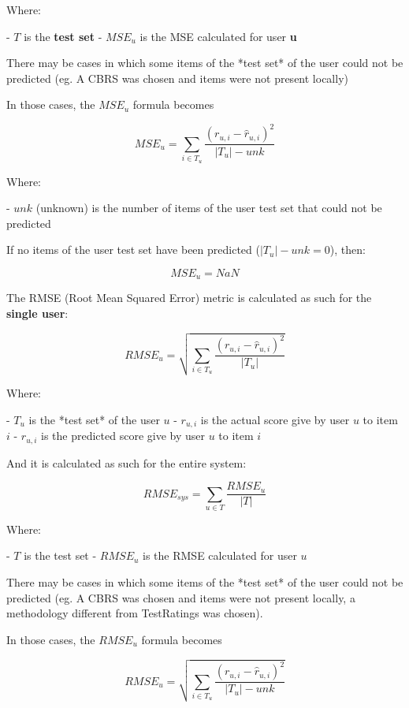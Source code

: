     Where:

    - $T$ is the \textbf{test set}
    - $MSE_u$ is the MSE calculated for user \textbf{u}

\hfill\break

There may be cases in which some items of the *test set* of the user could not be predicted (eg. A CBRS was chosen
and items were not present locally)

    In those cases, the $MSE_u$ formula becomes

    \[
    MSE_u = \sum_{i \in T_u} \frac{(r_{u,i} - \hat{r}_{u,i})^2}{|T_u| - unk}
    \]

    Where:

    - $unk$ (unknown) is the number of items of the user test set that could not be predicted

\hfill\break

If no items of the user test set have been predicted ($|T_u| - unk = 0$), then:

    \[
    MSE_u = NaN
    \]

\hfill\break


The RMSE (Root Mean Squared Error) metric is calculated as such for the \textbf{single user}:

    \[
    RMSE_u = \sqrt{\sum_{i \in T_u} \frac{(r_{u,i} - \hat{r}_{u,i})^2}{|T_u|}}
    \]

    Where:

    - $T_u$ is the *test set* of the user $u$
    - $r_{u, i}$ is the actual score give by user $u$ to item $i$
    - $\hat{r}_{u, i}$ is the predicted score give by user $u$ to item $i$

\hfill\break

And it is calculated as such for the entire system:

    \[
    RMSE_{sys} = \sum_{u \in T} \frac{RMSE_u}{|T|}
    \]

    Where:

    - $T$ is the test set
    - $RMSE_u$ is the RMSE calculated for user $u$

\hfill\break

There may be cases in which some items of the *test set* of the user could not be predicted (eg. A CBRS was chosen
and items were not present locally, a methodology different from TestRatings was chosen).

In those cases, the $RMSE_u$ formula becomes

    \[
    RMSE_u = \sqrt{\sum_{i \in T_u} \frac{(r_{u,i} - \hat{r}_{u,i})^2}{|T_u| - unk}}
    \]

